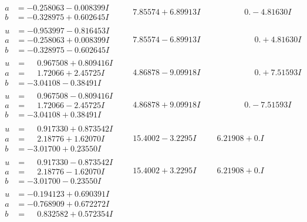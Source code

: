 \documentclass[1p]{elsarticle_modified}
\theoremstyle{definition}
\begin{document}
$$\begin{array}{c|c|c}
\begin{aligned}
a &= -0.258063 - 0.008399 I \\
b &= -0.328975 + 0.602645 I\end{aligned}
 & \phantom{-}7.85574 + 6.89913 I & \phantom{-0.000000 } 0. - 4.81630 I \\ \hline\begin{aligned}
u &= -0.953997 - 0.816453 I \\
a &= -0.258063 + 0.008399 I \\
b &= -0.328975 - 0.602645 I\end{aligned}
 & \phantom{-}7.85574 - 6.89913 I & \phantom{-0.000000 -}0. + 4.81630 I \\ \hline\begin{aligned}
u &= \phantom{-}0.967508 + 0.809416 I \\
a &= \phantom{-}1.72066 + 2.45725 I \\
b &= -3.04108 - 0.38491 I\end{aligned}
 & \phantom{-}4.86878 - 9.09918 I & \phantom{-0.000000 -}0. + 7.51593 I \\ \hline\begin{aligned}
u &= \phantom{-}0.967508 - 0.809416 I \\
a &= \phantom{-}1.72066 - 2.45725 I \\
b &= -3.04108 + 0.38491 I\end{aligned}
 & \phantom{-}4.86878 + 9.09918 I & \phantom{-0.000000 } 0. - 7.51593 I \\ \hline\begin{aligned}
u &= \phantom{-}0.917330 + 0.873542 I \\
a &= \phantom{-}2.18776 + 1.62070 I \\
b &= -3.01700 + 0.23550 I\end{aligned}
 & \phantom{-}15.4002 - 3.2295 I & \phantom{-}6.21908 + 0. I\phantom{ +0.000000I} \\ \hline\begin{aligned}
u &= \phantom{-}0.917330 - 0.873542 I \\
a &= \phantom{-}2.18776 - 1.62070 I \\
b &= -3.01700 - 0.23550 I\end{aligned}
 & \phantom{-}15.4002 + 3.2295 I & \phantom{-}6.21908 + 0. I\phantom{ +0.000000I} \\ \hline\begin{aligned}
u &= -0.194123 + 0.690391 I \\
a &= -0.768909 + 0.672272 I \\
b &= \phantom{-}0.832582 + 0.572354 I\end{aligned}

\end{array}$$
\end{document}
